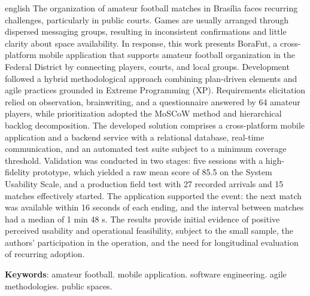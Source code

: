 \begin{resumo}[Abstract]
 \begin{otherlanguage*}{english}
  The organization of amateur football matches in Brasília faces recurring challenges, particularly in public courts. Games are usually arranged through dispersed messaging groups, resulting in inconsistent confirmations and little clarity about space availability. In response, this work presents BoraFut, a cross-platform mobile application that supports amateur football organization in the Federal District by connecting players, courts, and local groups. Development followed a hybrid methodological approach combining plan-driven elements and agile practices grounded in Extreme Programming (XP). Requirements elicitation relied on observation, brainwriting, and a questionnaire answered by 64 amateur players, while prioritization adopted the MoSCoW method and hierarchical backlog decomposition. The developed solution comprises a cross-platform mobile application and a backend service with a relational database, real-time communication, and an automated test suite subject to a minimum coverage threshold. Validation was conducted in two stages: five sessions with a high-fidelity prototype, which yielded a raw mean score of 85.5 on the System Usability Scale, and a production field test with 27 recorded arrivals and 15 matches effectively started. The application supported the event: the next match was available within 16 seconds of each ending, and the interval between matches had a median of 1 min 48 s. The results provide initial evidence of positive perceived usability and operational feasibility, subject to the small sample, the authors' participation in the operation, and the need for longitudinal evaluation of recurring adoption.

  \vspace{\onelineskip}

  \noindent 
  \textbf{Keywords}: amateur football. mobile application. software engineering. agile methodologies. public spaces.
  \end{otherlanguage*}
\end{resumo}
